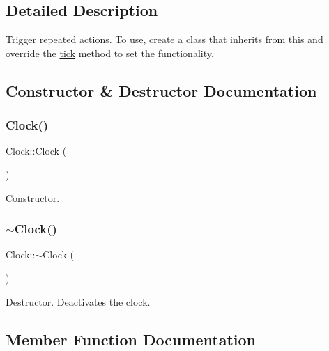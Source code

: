 \subsection{Detailed Description}
Trigger repeated actions. To use, create a class that inherits from this and override the \hyperlink{classdrumpi_1_1clock_1_1Clock_ade9259c06e6b90bbd92e155a2506d3a1}{tick} method to set the functionality. 

\subsection{Constructor \& Destructor Documentation}
\mbox{\label{classdrumpi_1_1clock_1_1Clock_adbc370eb6b5f8d01645cf440188160a8}} 
\subsubsection{\texorpdfstring{Clock()}{Clock()}}
{\footnotesize\ttfamily Clock\+::\+Clock (\begin{DoxyParamCaption}{ }\end{DoxyParamCaption})}

Constructor. \mbox{\label{classdrumpi_1_1clock_1_1Clock_afc976ce68fa85e15cc06f9ed47bddb7c}} 
\subsubsection{\texorpdfstring{$\sim$\+Clock()}{~Clock()}}
{\footnotesize\ttfamily Clock\+::$\sim$\+Clock (\begin{DoxyParamCaption}{ }\end{DoxyParamCaption})}

Destructor. Deactivates the clock. 

\subsection{Member Function Documentation}
\mbox{\label{classdrumpi_1_1clock_1_1Clock_a329b705dad4e8949df7dde09d74b096f}} 
